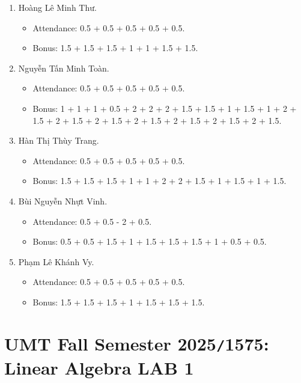 \documentclass{article}
\begin{document}
\begin{enumerate}
\begin{itemize}
        \item Attendance: 0.5 + 0.5 + 0.5 + 0.5 + 0.5.
        \item Bonus: 1.5 + 1.5 + 1.5 + 1.5 + 2 + 1 + 2 + 1 + 1.5 + 2 + 1.75 + 1 + 1 + 2 + 1 + 2.
    \end{itemize}
    \item {\sc Hoàng Lê Minh Thư.}
    \begin{itemize}
        \item Attendance: 0.5 + 0.5 + 0.5 + 0.5 + 0.5.
        \item Bonus: 1.5 + 1.5 + 1.5 + 1 + 1 + 1.5 + 1.5.
    \end{itemize}
    \item {\sc Nguyễn Tấn Minh Toàn.}
    \begin{itemize}
        \item Attendance: 0.5 + 0.5 + 0.5 + 0.5 + 0.5.
        \item Bonus: 1 + 1 + 1 + 0.5 + 2 + 2 + 2 + 1.5 + 1.5 + 1 + 1.5 + 1 + 2 + 1.5 + 2 + 1.5 +  2 + 1.5 +  2 + 1.5 +  2 + 1.5 + 2 + 1.5 + 2 + 1.5.
    \end{itemize}
    \item {\sc Hàn Thị Thùy Trang.}
    \begin{itemize}
        \item Attendance: 0.5 + 0.5 + 0.5 + 0.5 + 0.5.
        \item Bonus: 1.5 + 1.5 + 1.5 + 1 + 1 + 2 + 2 + 1.5 + 1 + 1.5 + 1 + 1.5.
    \end{itemize}
    \item {\sc Bùi Nguyễn Nhựt Vinh.}
    \begin{itemize}
        \item Attendance: 0.5 + 0.5 - 2 + 0.5.
        \item Bonus: 0.5 + 0.5 + 1.5 + 1 + 1.5 + 1.5 + 1.5 + 1 + 0.5 + 0.5.
    \end{itemize}
    \item {\sc Phạm Lê Khánh Vy.}
    \begin{itemize}
        \item Attendance: 0.5 + 0.5 + 0.5 + 0.5 + 0.5.
        \item Bonus: 1.5 + 1.5 + 1.5 + 1 + 1.5 + 1.5 + 1.5.
    \end{itemize}
\end{enumerate}


\section{UMT Fall Semester 2025{\tt/}1575: Linear Algebra LAB 1}
\end{document}
